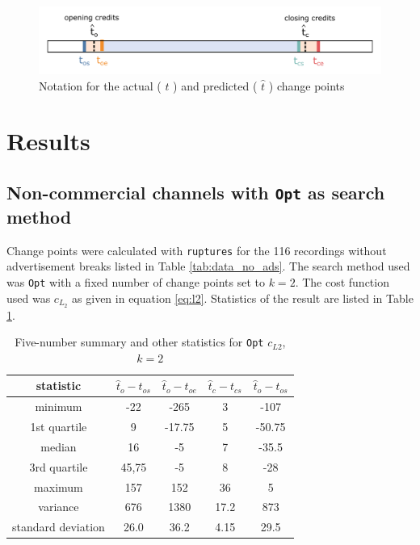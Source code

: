 \begin{figure}[H]
    \centering
    \includegraphics[width=1\textwidth]{../plots/timeline.pdf}
    \caption{Notation for the actual ( $t$ ) and predicted ( $\hat{t}$ ) change points}
    \label{fig:change_point_notation}
\end{figure}

\section{Results} \label{sec:results}

\subsection{Non-commercial channels with \texttt{Opt} as search method} \label{sec:results_opt}

Change points were calculated with \texttt{ruptures} for the 116 recordings without advertisement breaks listed in Table \ref{tab:data_no_ads}. The search method used was \texttt{Opt} with a fixed number of change points set to $k=2$. The cost function used was $c_{L_2}$ as given in equation \ref{eq:l2}. Statistics of the result are listed in Table \ref{tab:statistics_opt}.

\begin{table}[h]
    \begin{center}
    \begin{tabular}{|c|c|c|c|c|}%
        \hline
        \textbf{statistic} & $\hat{t}_o-t_{os}$ & $\hat{t}_o-t_{oe}$ & $\hat{t}_c-t_{cs}$ & $\hat{t}_o-t_{os}$  \\ \hline
        minimum & -22 & -265 & 3 & -107\\ \hline
        1st quartile & 9 & -17.75 & 5 & -50.75\\ \hline
        median & 16 & -5 & 7 & -35.5\\ \hline
        3rd quartile & 45,75 & -5 & 8 & -28 \\ \hline
        maximum & 157 & 152	& 36 & 5\\ \hline
        variance & 676 & 1380	& 17.2 & 873\\ \hline
        standard deviation & 26.0 & 36.2 & 4.15 & 29.5\\ \hline
    \end{tabular}
    \end{center}
    \caption{Five-number summary and other statistics for \texttt{Opt} $c_{L2}$, $k=2$}
    \label{tab:statistics_opt}
\end{table}

